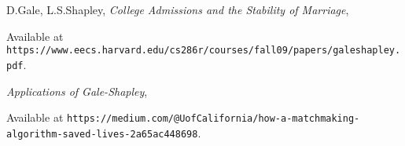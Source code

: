\documentclass{article}
\begin{document}
\begin{thebibliography}{10}

 D.Gale, L.S.Shapley, 
\emph{College Admissions and the Stability of Marriage},


Available at \texttt{https://www.eecs.harvard.edu/cs286r/courses/fall09/papers/galeshapley.pdf}.

\emph{Applications of Gale-Shapley},


Available at \texttt{https://medium.com/@UofCalifornia/how-a-matchmaking-algorithm-saved-lives-2a65ac448698}.


\end{thebibliography}
\end{document}
